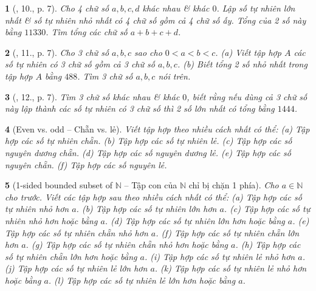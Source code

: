 \documentclass{article}
\newtheorem{baitoan}{}
\begin{document}
\begin{baitoan}[\cite{Binh_Toan_6_tap_1}, 10., p. 7]
	Cho 4 chữ số $a,b,c,d$ khác nhau \& khác $0$. Lập số tự nhiên lớn nhất \& số tự nhiên nhỏ nhất có 4 chữ số gồm cả 4 chữ số ấy. Tổng của 2 số này bằng $11330$. Tìm tổng các chữ số $a + b + c + d$.
\end{baitoan}

\begin{baitoan}[\cite{Binh_Toan_6_tap_1}, 11., p. 7]
	Cho 3 chữ số $a,b,c$ sao cho $0 < a < b < c$. (a) Viết tập hợp $A$ các số tự nhiên có 3 chữ số gồm cả 3 chữ số $a,b,c$. (b) Biết tổng 2 số nhỏ nhất trong tập hợp $A$ bằng $488$. Tìm 3 chữ số $a,b,c$ nói trên.
\end{baitoan}

\begin{baitoan}[\cite{Binh_Toan_6_tap_1}, 12., p. 7]
	Tìm 3 chữ số khác nhau \& khác $0$, biết rằng nếu dùng cả 3 chữ số này lập thành các số tự nhiên có 3 chữ số thì 2 số lớn nhất có tổng bằng $1444$.
\end{baitoan}

\begin{baitoan}[Even vs. odd -- Chẵn vs. lẻ]
	Viết tập hợp theo nhiều cách nhất có thể: (a) Tập hợp các số tự nhiên chẵn. (b) Tập hợp các số tự nhiên lẻ. (c) Tập hợp các số nguyên dương chẵn. (d) Tập hợp các số nguyên dương lẻ. (e) Tập hợp các số nguyên chẵn. (f) Tập hợp các số nguyên lẻ.
\end{baitoan}

\begin{baitoan}[1-sided bounded subset of $\mathbb{N}$ -- Tập con của $\mathbb{N}$ chỉ bị chặn 1 phía]
	Cho $a\in\mathbb{N}$ cho trước. Viết các tập hợp sau theo nhiều cách nhất có thể: (a) Tập hợp các số tự nhiên nhỏ hơn $a$. (b) Tập hợp các số tự nhiên lớn hơn $a$. (c) Tập hợp các số tự nhiên nhỏ hơn hoặc bằng $a$. (d) Tập hợp các số tự nhiên lớn hơn hoặc bằng $a$. (e) Tập hợp các số tự nhiên chẵn nhỏ hơn $a$. (f) Tập hợp các số tự nhiên chẵn lớn hơn $a$. (g) Tập hợp các số tự nhiên chẵn nhỏ hơn hoặc bằng $a$. (h) Tập hợp các số tự nhiên chẵn lớn hơn hoặc bằng $a$. (i) Tập hợp các số tự nhiên lẻ nhỏ hơn $a$. (j) Tập hợp các số tự nhiên lẻ lớn hơn $a$. (k) Tập hợp các số tự nhiên lẻ nhỏ hơn hoặc bằng $a$. (l) Tập hợp các số tự nhiên lẻ lớn hơn hoặc bằng $a$.
\end{baitoan}
\end{document}
